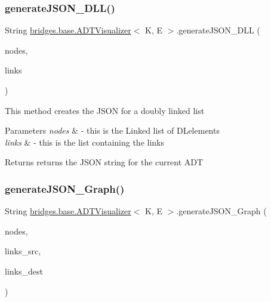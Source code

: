 \subsubsection{\texorpdfstring{generate\+J\+S\+O\+N\+\_\+\+D\+L\+L()}{generateJSON\_DLL()}}
{\footnotesize\ttfamily String \hyperlink{classbridges_1_1base_1_1_a_d_t_visualizer}{bridges.\+base.\+A\+D\+T\+Visualizer}$<$ K, E $>$.generate\+J\+S\+O\+N\+\_\+\+D\+LL (\begin{DoxyParamCaption}\item[{Linked\+List$<$ \hyperlink{classbridges_1_1base_1_1_d_lelement}{D\+Lelement}$<$ E $>$$>$}]{nodes,  }\item[{Linked\+List$<$ \hyperlink{classbridges_1_1base_1_1_d_lelement}{D\+Lelement}$<$ E $>$$>$}]{links }\end{DoxyParamCaption})}

This method creates the J\+S\+ON for a doubly linked list 
\begin{DoxyParams}{Parameters}
{\em nodes} & -\/ this is the Linked list of D\+Lelements \\
\hline
{\em links} & -\/ this is the list containing the links \\
\hline
\end{DoxyParams}
\begin{DoxyReturn}{Returns}
returns the J\+S\+ON string for the current A\+DT 
\end{DoxyReturn}
\hypertarget{classbridges_1_1base_1_1_a_d_t_visualizer_aabf7cbfbed0cd28b365206281176834b}{}\label{classbridges_1_1base_1_1_a_d_t_visualizer_aabf7cbfbed0cd28b365206281176834b} 
\subsubsection{\texorpdfstring{generate\+J\+S\+O\+N\+\_\+\+Graph()}{generateJSON\_Graph()}}
{\footnotesize\ttfamily String \hyperlink{classbridges_1_1base_1_1_a_d_t_visualizer}{bridges.\+base.\+A\+D\+T\+Visualizer}$<$ K, E $>$.generate\+J\+S\+O\+N\+\_\+\+Graph (\begin{DoxyParamCaption}\item[{Linked\+List$<$ \hyperlink{classbridges_1_1base_1_1_element}{Element}$<$ E $>$$>$}]{nodes,  }\item[{Linked\+List$<$ \hyperlink{classbridges_1_1base_1_1_element}{Element}$<$ E $>$$>$}]{links\+\_\+src,  }\item[{Linked\+List$<$ \hyperlink{classbridges_1_1base_1_1_element}{Element}$<$ E $>$$>$}]{links\+\_\+dest }\end{DoxyParamCaption})}

